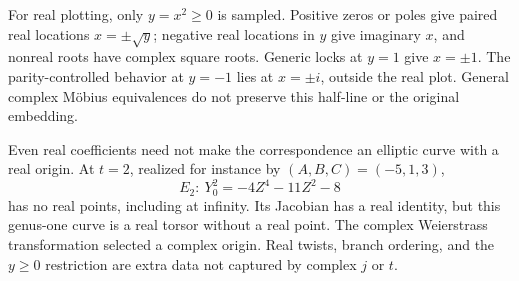 For real plotting, only \(y=x^2\ge0\) is sampled. Positive zeros or poles give paired real locations \(x=\pm\sqrt y\); negative real locations in \(y\) give imaginary \(x\), and nonreal roots have complex square roots. Generic locks at \(y=1\) give \(x=\pm1\). The parity-controlled behavior at \(y=-1\) lies at \(x=\pm i\), outside the real plot. General complex Möbius equivalences do not preserve this half-line or the original embedding.

Even real coefficients need not make the correspondence an elliptic curve with a real origin. At \(t=2\), realized for instance by \((A,B,C)=(-5,1,3)\),
\begin{equation}\label{eq:real_torsor}
 E_2:\ Y_0^2=-4Z^4-11Z^2-8
\end{equation}
has no real points, including at infinity. Its Jacobian has a real identity, but this genus-one curve is a real torsor without a real point. The complex Weierstrass transformation selected a complex origin. Real twists, branch ordering, and the \(y\ge0\) restriction are extra data not captured by complex \(j\) or \(t\).
